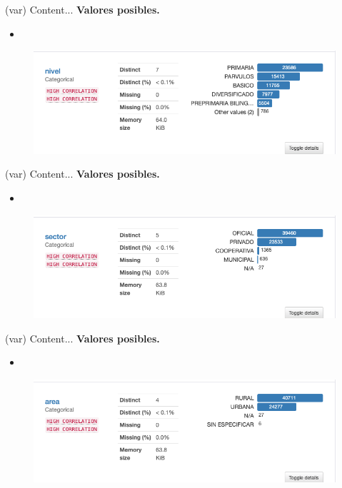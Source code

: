 
\begin{variable}(var) 
Content... 
\bigbreak 
\textbf{Valores posibles.}
\begin{itemize}
	\item 
\end{itemize}
\begin{figure}[H]
	\centering
	\includegraphics[scale=0.5]{Images/8}
\end{figure}
\end{variable}


\begin{variable}(var) 
Content... 
\bigbreak 
\textbf{Valores posibles.}
\begin{itemize}
	\item 
\end{itemize}
\begin{figure}[H]
	\centering
	\includegraphics[scale=0.5]{Images/9}
\end{figure}
\end{variable}


\begin{variable}(var) 
Content... 
\bigbreak 
\textbf{Valores posibles.}
\begin{itemize}
	\item 
\end{itemize}
\begin{figure}[H]
	\centering
	\includegraphics[scale=0.5]{Images/10}
\end{figure}
\end{variable}

